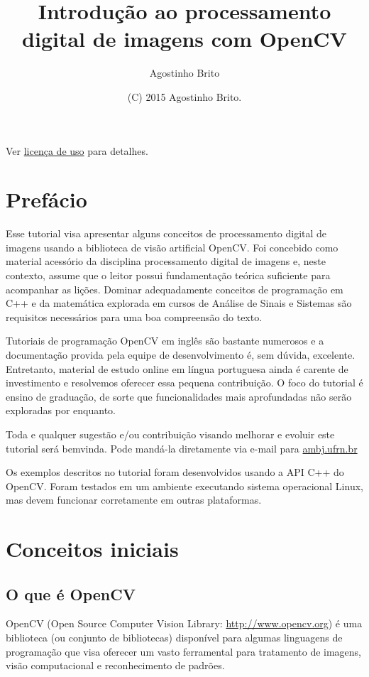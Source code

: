 \documentclass[11pt]{amsbook}
\title{Introdução ao processamento digital de imagens com OpenCV}
\author{Agostinho Brito}
\date{(C) 2015 Agostinho Brito.}
\begin{document}
\maketitle
\tableofcontents
Ver \href{licenca.html}{licença de uso} para detalhes.


\hypertarget{x-prefácio}{\chapter{Prefácio}}
Esse tutorial visa apresentar alguns conceitos de processamento
digital de imagens usando a biblioteca de visão artificial OpenCV. Foi
concebido como material acessório da disciplina processamento digital
de imagens e, neste contexto, assume que o leitor possui fundamentação
teórica suficiente para acompanhar as lições. Dominar adequadamente
conceitos de programação em C++ e da matemática explorada em cursos de
Análise de Sinais e Sistemas são requisitos necessários para uma boa
compreensão do texto.


Tutoriais de programação OpenCV em inglês são bastante numerosos e a
documentação provida pela equipe de desenvolvimento é, sem dúvida,
excelente. Entretanto, material de estudo online em língua portuguesa
ainda é carente de investimento e resolvemos oferecer essa pequena
contribuição. O foco do tutorial é ensino de graduação, de sorte que
funcionalidades mais aprofundadas não serão exploradas por enquanto.


Toda e qualquer sugestão e/ou contribuição visando melhorar e evoluir
este tutorial será bemvinda. Pode mandá-la diretamente via e-mail para
\href{mailto:ambj\dca.ufrn.br}{ambj\dca.ufrn.br}


Os exemplos descritos no tutorial foram desenvolvidos usando a API C++
do OpenCV. Foram testados em um ambiente executando sistema
operacional Linux, mas devem funcionar corretamente em outras
plataformas.


\hypertarget{x-conceitos-iniciais}{\chapter{Conceitos iniciais}}
\hypertarget{x-o-que-é-opencv}{\section{O que é OpenCV}}
OpenCV (Open Source Computer Vision Library:
\href{http://www.opencv.org}{http://www.opencv.org}) é uma
biblioteca (ou conjunto de bibliotecas) disponível para algumas
linguagens de programação que visa oferecer um vasto ferramental para
tratamento de imagens, visão computacional e reconhecimento de
padrões.
\end{document}
